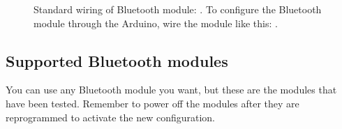 		\begin{figure}[H]
		\hfill
		\caption{Standard wiring of Bluetooth module: \protect{\ref{fig:arduino_standard_wiring}}. To configure the Bluetooth module through the Arduino, wire the module like this: \protect{\ref{fig:arduino_configure_bluetooth}}.}
		\end{figure}

			\subsection{Supported Bluetooth modules}
			You can use any Bluetooth module you want, but these are the modules that have been tested. Remember to power off the modules after they are reprogrammed to activate the new configuration.\\
			
